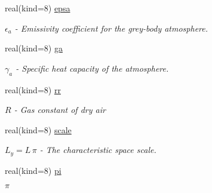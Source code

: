 \begin{DoxyCompactItemize}
\mbox{\label{structparams_1_1physicsconfiguration_aaa294f145e44aedbf1753489712f7287}} 
real(kind=8) \hyperlink{structparams_1_1physicsconfiguration_aaa294f145e44aedbf1753489712f7287}{epsa}
\begin{DoxyCompactList}\small\item\em $\epsilon_a$ -\/ Emissivity coefficient for the grey-\/body atmosphere. \end{DoxyCompactList}\item 
\mbox{\label{structparams_1_1physicsconfiguration_adc8b14810a8f7e5e53b0b1f6b9a937bb}} 
real(kind=8) \hyperlink{structparams_1_1physicsconfiguration_adc8b14810a8f7e5e53b0b1f6b9a937bb}{ga}
\begin{DoxyCompactList}\small\item\em $\gamma_a$ -\/ Specific heat capacity of the atmosphere. \end{DoxyCompactList}\item 
\mbox{\label{structparams_1_1physicsconfiguration_a460a0de811fc4c11ad909e29ce207790}} 
real(kind=8) \hyperlink{structparams_1_1physicsconfiguration_a460a0de811fc4c11ad909e29ce207790}{rr}
\begin{DoxyCompactList}\small\item\em $R$ -\/ Gas constant of dry air \end{DoxyCompactList}\item 
\mbox{\label{structparams_1_1physicsconfiguration_a1ce9d943cc0f57b13de1e07fbf4659c8}} 
real(kind=8) \hyperlink{structparams_1_1physicsconfiguration_a1ce9d943cc0f57b13de1e07fbf4659c8}{scale}
\begin{DoxyCompactList}\small\item\em $L_y = L \, \pi$ -\/ The characteristic space scale. \end{DoxyCompactList}\item 
\mbox{\label{structparams_1_1physicsconfiguration_ae17384a4e312cca87427114772725932}} 
real(kind=8) \hyperlink{structparams_1_1physicsconfiguration_ae17384a4e312cca87427114772725932}{pi}
\begin{DoxyCompactList}\small\item\em $\pi$ \end{DoxyCompactList}\item 

\end{DoxyCompactItemize}
